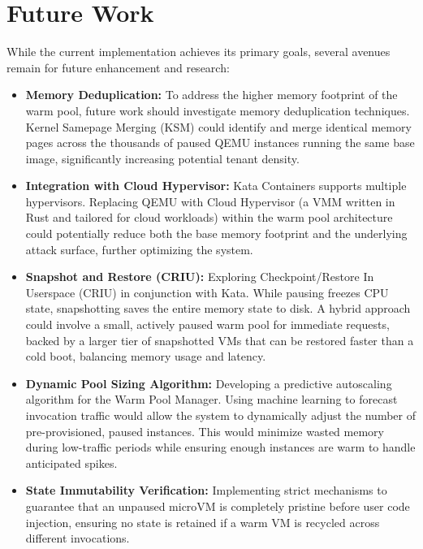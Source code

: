 \section{Future Work}
While the current implementation achieves its primary goals, several avenues remain for future enhancement and research:

\begin{itemize}
    \item \textbf{Memory Deduplication:} To address the higher memory footprint of the warm pool, future work should investigate memory deduplication techniques. Kernel Samepage Merging (KSM) could identify and merge identical memory pages across the thousands of paused QEMU instances running the same base image, significantly increasing potential tenant density.

    \item \textbf{Integration with Cloud Hypervisor:} Kata Containers supports multiple hypervisors. Replacing QEMU with Cloud Hypervisor (a VMM written in Rust and tailored for cloud workloads) within the warm pool architecture could potentially reduce both the base memory footprint and the underlying attack surface, further optimizing the system.

    \item \textbf{Snapshot and Restore (CRIU):} Exploring Checkpoint/Restore In Userspace (CRIU) in conjunction with Kata. While pausing freezes CPU state, snapshotting saves the entire memory state to disk. A hybrid approach could involve a small, actively paused warm pool for immediate requests, backed by a larger tier of snapshotted VMs that can be restored faster than a cold boot, balancing memory usage and latency.

    \item \textbf{Dynamic Pool Sizing Algorithm:} Developing a predictive autoscaling algorithm for the Warm Pool Manager. Using machine learning to forecast invocation traffic would allow the system to dynamically adjust the number of pre-provisioned, paused instances. This would minimize wasted memory during low-traffic periods while ensuring enough instances are warm to handle anticipated spikes.

    \item \textbf{State Immutability Verification:} Implementing strict mechanisms to guarantee that an unpaused microVM is completely pristine before user code injection, ensuring no state is retained if a warm VM is recycled across different invocations.
\end{itemize}

\vspace{1.5cm}
\lipsum[81-100] %
